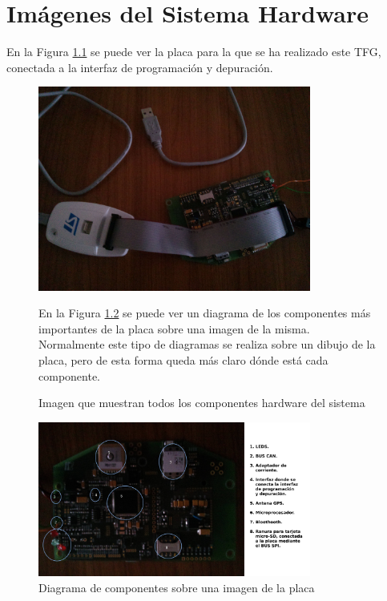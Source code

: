 \chapter{Imágenes del Sistema Hardware}
\label{anexo:img}
En la Figura \ref{fig:all} se puede ver la placa para la que se ha realizado este \acs{TFG}, conectada a la interfaz de programación y depuración.\\

\begin{figure}[!h]
\begin{center}
\includegraphics[width=0.8\textwidth]{figs/all.jpg}
\caption{Imagen que muestran todos los componentes hardware del sistema}
\label{fig:all}
\end{center}

En la Figura \ref{fig:frontDiagram} se puede ver un diagrama de los componentes más importantes de la placa sobre una imagen de la misma. Normalmente este tipo de diagramas se realiza sobre un dibujo de la placa, pero de esta forma queda más claro dónde está cada componente.\\

\end{figure}
\begin{figure}[!h]
\begin{center}
\includegraphics[width=0.8\textwidth]{figs/frontDiagram.jpg}
\caption{Diagrama de componentes sobre una imagen de la placa}
\label{fig:frontDiagram}
\end{center}
\end{figure}

